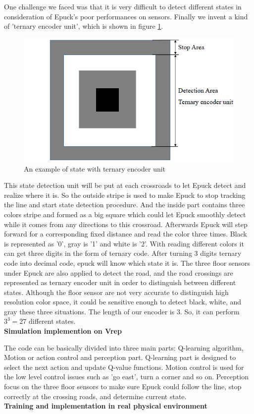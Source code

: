 \documentclass[a4paper, 11pt]{article} %
\begin{document}
One challenge we faced was that it is very difficult to detect different states in consideration of Epuck's poor performances on sensors. Finally we invent a kind of 'ternary encoder unit', which is shown in figure \ref{fig2}. 
\begin{figure}[tb]
\centering 
\includegraphics[width=0.6\columnwidth]{encoder} 
\caption[An example of a floating figure]{An example of state with ternary encoder unit} %
\label{fig2} 
\end{figure}
This state detection unit will be put at each crossroads to let Epuck detect and realize where it is. 
So the outside stripe is used to make Epuck to stop tracking the line and start state detection procedure. 
And the inside part contains three colors stripe and formed as a big square which could let Epuck smoothly detect while it comes from any directions to this crossroad. 
Afterwards Epuck will step forward for a corresponding fixed distance and read the color three times. 
Black is represented as '0', gray is '1' and white is '2'. With reading different colors it can get three digits in the form of ternary code. 
After turning 3 digits ternary code into decimal code, epuck will know which state it is.
The three floor sensors under Epuck are also applied to detect the road, and the
road crossings are represented as ternary encoder unit in order to distinguish
between different states. Although the floor sensor are not very accurate to
distinguish high resolution color space, it could be sensitive enough to detect
black, white, and gray these three situations. The length of our encoder is 3.
So, it can perform $3^3 = 27$ different states.
\\[3ex]
\textbf{Simulation implemention on Vrep}

The code can be basically divided
into three main parts: Q-learning algorithm, Motion or action control and
perception part. Q-learning part is designed to select the next action and update
Q-value functions. Motion control is used for the low level control issues such as
'go east', turn a corner and so on. Perception focus on the three floor sensors
to make sure Epuck could follow the line, stop correctly at the crossing roads,
and determine current state.
\\[3ex]
\textbf{Training and implementation in real physical environment}
\end{document}

